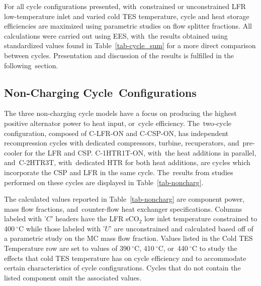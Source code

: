 \documentclass[sustainability,article,accept,moreauthors,pdftex]{Definitions/mdpi}
\newcommand{\mw}[1]{\comment[id=MW]{#1}}
\begin{document}
\begin{paracol}{2}
For all cycle configurations presented, with~constrained or unconstrained LFR low-temperature inlet and varied cold TES temperature, cycle and heat storage efficiencies are maximized using parametric studies on flow splitter fractions. %
{All calculations were carried out using EES, with~the results}
obtained using standardized values found in \mbox{Table \ref{tab-cycle_sum}} for a more direct comparison between cycles. Presentation and discussion of the results is fulfilled in the following~section. 

\subsection{Non-Charging Cycle~Configurations}

The three non-charging cycle models have a focus on producing the highest positive alternator power to heat input, or~cycle efficiency. The~two-cycle configuration, composed of C-LFR-ON and C-CSP-ON, has independent recompression cycles with dedicated compressors, turbine, recuperators, and~pre-cooler for the LFR and CSP. C-1HTR1T-ON, with~the heat additions in parallel, and~C-2HTR3T, with~dedicated HTR for both heat additions, are cycles which incorporate the CSP and LFR in the same cycle. The~results from studies performed on these cycles are displayed in Table~\ref{tab-noncharg}. 

The calculated values reported in Table~\ref{tab-noncharg} are component power, mass flow fractions, and~counter-flow heat exchanger specifications. Columns labeled with '$C$' headers have the LFR sCO$_2$ low inlet temperature constrained to 400$~^{\circ}$C while those labeled with '$U$' are unconstrained and calculated based off of a parametric study on the MC mass flow fraction. Values listed in the Cold TES Temperature row are set to values of 390$~^{\circ}$C, 410$~^{\circ}$C, or~440$~^{\circ}$C to study the effects that cold TES temperature has on cycle efficiency and to accommodate certain characteristics of cycle configurations. %
{Cycles that do not contain the listed component omit the associated values.}
\clearpage 
\end{paracol}
\end{document}
